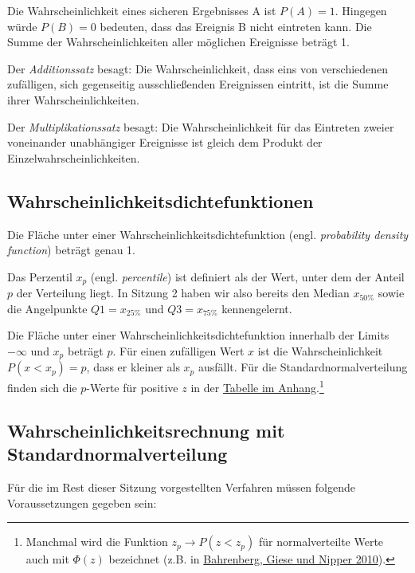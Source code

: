 \documentclass[
  ngerman,
]{article}
\begin{document}
Die Wahrscheinlichkeit eines sicheren Ergebnisses A ist \(P(A) = 1\). Hingegen würde \(P(B) = 0\) bedeuten, dass das Ereignis B nicht eintreten kann. Die Summe der Wahrscheinlichkeiten aller möglichen Ereignisse beträgt 1.

Der \emph{Additionssatz} besagt: Die Wahrscheinlichkeit, dass eins von verschiedenen zufälligen, sich gegenseitig ausschließenden Ereignissen eintritt, ist die Summe ihrer Wahrscheinlichkeiten.

Der \emph{Multiplikationssatz} besagt: Die Wahrscheinlichkeit für das Eintreten zweier voneinander unabhängiger Ereignisse ist gleich dem Produkt der Einzelwahrscheinlichkeiten.

\hypertarget{wahrscheinlichkeitsdichtefunktionen}{%
\subsection{Wahrscheinlichkeitsdichtefunktionen}\label{wahrscheinlichkeitsdichtefunktionen}}

Die Fläche unter einer Wahrscheinlichkeitsdichtefunktion (engl. \emph{probability density function}) beträgt genau 1.

Das Perzentil \(x_p\) (engl. \emph{percentile}) ist definiert als der Wert, unter dem der Anteil \(p\) der Verteilung liegt. In Sitzung 2 haben wir also bereits den Median \(x_{50\%}\) sowie die Angelpunkte \(Q1=x_{25\%}\) und \(Q3=x_{75\%}\) kennengelernt.

Die Fläche unter einer Wahrscheinlichkeitsdichtefunktion innerhalb der Limits \(-\infty\) und \(x_p\) beträgt \(p\). Für einen zufälligen Wert \(x\) ist die Wahrscheinlichkeit \(P(x < x_p) = p\), dass er kleiner als \(x_p\) ausfällt.
Für die Standardnormalverteilung finden sich die \(p\)-Werte für positive \(z\) in der \protect\hyperlink{ptab}{Tabelle im Anhang}.\footnote{Manchmal wird die Funktion \(z_p \rightarrow P(z < z_p)\) für normalverteilte Werte auch mit \(\Phi(z)\) bezeichnet (z.B. in \protect\hyperlink{ref-bahrenberg}{Bahrenberg, Giese und Nipper 2010}).}

\hypertarget{wahrscheinlichkeitsrechnung-mit-standardnormalverteilung}{%
\subsection{Wahrscheinlichkeitsrechnung mit Standardnormalverteilung}\label{wahrscheinlichkeitsrechnung-mit-standardnormalverteilung}}

Für die im Rest dieser Sitzung vorgestellten Verfahren müssen folgende Voraussetzungen gegeben sein:
\end{document}
